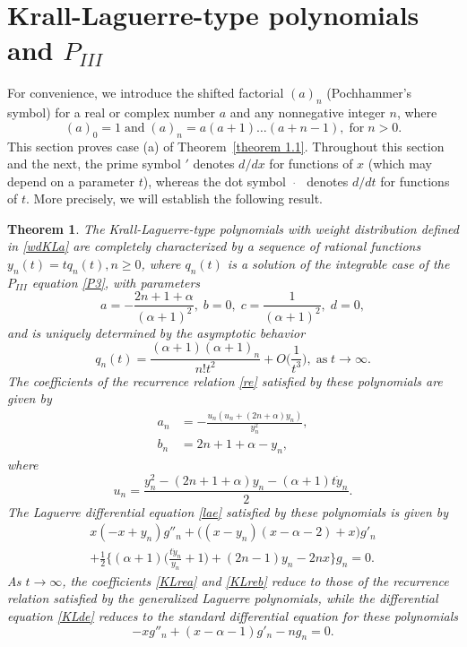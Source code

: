 \documentclass[10pt, reqno]{amsart}
\numberwithin{equation}{section}
\newtheorem{theorem}{Theorem}[section]
\numberwithin{equation}{section}
\begin{document}
\section{Krall-Laguerre-type polynomials and $P_{III}$}
For convenience, we introduce the shifted factorial $(a)_n$ (Pochhammer's symbol) for a real or complex number $a$ and any nonnegative integer $n$, where 
\begin{equation*}
(a)_0=1\;\mbox{and}\; (a)_n=a(a+1)\ldots (a+n-1),\;\mbox{for}\; n>0.
\end{equation*}
This section proves case (a) of Theorem~\ref{theorem 1.1}. Throughout this section and the next, the prime symbol $'$ denotes $d/dx$ for functions of $x$ (which may depend on a parameter $t$), whereas the dot symbol $\dot{\quad}$ denotes $d/dt$ for functions of $t$. More precisely, we will establish the following result.
\begin{theorem} \label{theorem 3.1}
The Krall-Laguerre-type polynomials with weight distribution defined in \eqref{wdKLa} are completely characterized by a sequence of rational functions $y_n(t)=tq_n(t), n\geq 0$, where $q_n(t)$ is a solution of the integrable case of the $P_{III}$ equation \eqref{P3}, with parameters
\begin{equation} 
a=-\frac{2n+1+\alpha}{(\alpha+1)^2},\;b=0,\;c=\frac{1}{(\alpha+1)^2},\;d=0,\label{KLP3}
\end{equation}
and is uniquely determined by the asymptotic behavior
\begin{equation}
q_n(t)=\frac{(\alpha+1)(\alpha+1)_n}{n!t^2}+O\Big(\frac{1}{t^3}\Big),\;\mbox{as}\;t\to \infty.\label{aKLP3}
\end{equation}
The coefficients of the recurrence relation \eqref{re} satisfied by these polynomials are given by
\begin{align}
a_n&=-\frac{u_n(u_n+(2n+\alpha)y_n)}{y_n^2}, \label{KLrea}\\
b_n&=2n+1+\alpha-y_n, \label{KLreb}
\end{align}
where
\begin{equation}
u_n=\frac{y_n ^2-(2n+1+\alpha)y_n-(\alpha+1)t\dot{y}_n}{2}.\label{KLuy}
\end{equation}
The Laguerre differential equation \eqref{lae} satisfied by these polynomials is given by
\begin{multline} 
x(-x+y_n)g''_n+\big((x-y_n)(x-\alpha-2)+x\big)g'_n\\
+\frac{1}{2}\Big\{(\alpha+1)\Big(\frac{t\dot{y}_n}{y_n}+1\Big)+(2n-1)y_n-2nx\Big\}g_n=0.\label{KLde}
\end{multline}
As $t\to\infty$, the coefficients \eqref{KLrea} and \eqref{KLreb} reduce to those of the recurrence relation satisfied by the generalized Laguerre polynomials, while the differential equation \eqref{KLde} reduces to the standard differential equation for these polynomials
\begin{equation} \label{Lde}
-xg''_n+(x-\alpha-1)g'_n-ng_n=0.
\end{equation}
\end{theorem}
\end{document}
